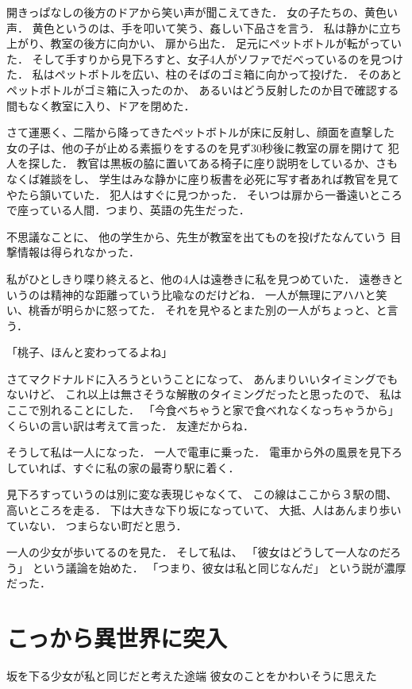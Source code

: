 開きっぱなしの後方のドアから笑い声が聞こえてきた．
女の子たちの、黄色い声．
黄色というのは、手を叩いて笑う、姦しい下品さを言う．
私は静かに立ち上がり、教室の後方に向かい、 扉から出た．
足元にペットボトルが転がっていた．
そして手すりから見下ろすと、女子4人がソファでだべっているのを見つけた．
私はペットボトルを広い、柱のそばのゴミ箱に向かって投げた．
そのあとペットボトルがゴミ箱に入ったのか、
あるいはどう反射したのか目で確認する間もなく教室に入り、ドアを閉めた．

さて運悪く、二階から降ってきたペットボトルが床に反射し、顔面を直撃した
女の子は、他の子が止める素振りをするのを見ず30秒後に教室の扉を開けて
犯人を探した．
教官は黒板の脇に置いてある椅子に座り説明をしているか、さもなくば雑談をし、
学生はみな静かに座り板書を必死に写す者あれば教官を見てやたら頷いていた．
犯人はすぐに見つかった．
そいつは扉から一番遠いところで座っている人間．つまり、英語の先生だった．

不思議なことに、 他の学生から、先生が教室を出てものを投げたなんていう
目撃情報は得られなかった．

私がひとしきり喋り終えると、他の4人は遠巻きに私を見つめていた．
遠巻きというのは精神的な距離っていう比喩なのだけどね．
一人が無理にアハハと笑い、桃香が明らかに怒ってた．
それを見やるとまた別の一人がちょっと、と言う．

「桃子、ほんと変わってるよね」

さてマクドナルドに入ろうということになって、
あんまりいいタイミングでもないけど、
これ以上は無さそうな解散のタイミングだったと思ったので、
私はここで別れることにした．
「今食べちゃうと家で食べれなくなっちゃうから」
くらいの言い訳は考えて言った． 友達だからね．

そうして私は一人になった． 一人で電車に乗った．
電車から外の風景を見下ろしていれば、すぐに私の家の最寄り駅に着く．

見下ろすっていうのは別に変な表現じゃなくて、
この線はここから３駅の間、高いところを走る．
下は大きな下り坂になっていて、 大抵、人はあんまり歩いていない．
つまらない町だと思う．

一人の少女が歩いてるのを見た． そして私は、
「彼女はどうして一人なのだろう」 という議論を始めた．
「つまり、彼女は私と同じなんだ」 という説が濃厚だった．

\section{こっから異世界に突入}

坂を下る少女が私と同じだと考えた途端 彼女のことをかわいそうに思えた


